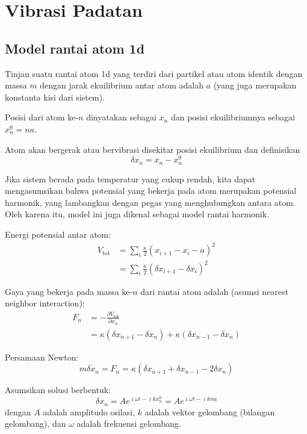 \chapter{Vibrasi Padatan}
\section{Model rantai atom 1d}

Tinjau suatu rantai atom 1d yang terdiri dari partikel atau atom identik
dengan massa \(m\) dengan jarak ekuilibrium antar atom adalah \(a\)
(yang juga merupakan konstanta kisi dari sistem).

Posisi dari atom ke-\(n\) dinyatakan sebagai \(x_{n}\) dan posisi
ekuilibriumnya sebagai \(x^{0}_{n} = na\).

Atom akan bergerak atau bervibrasi disekitar posisi ekuilibrium dan
definisikan \[
\delta x_{n} = x_{n} - x^{0}_{n}
\]

Jika sistem berada pada temperatur yang cukup rendah, kita dapat
mengasumsikan bahwa potensial yang bekerja pada atom merupakan potensial
harmonik, yang lambangkan dengan pegas yang menghubungkan antara atom.
Oleh karena itu, model ini juga dikenal sebagai model rantai harmonik.

Energi potensial antar atom:
\begin{align*}
V_{\mathrm{tot}} & = \sum_{i} \frac{\kappa}{2} \left(
x_{i+1} - x_{i} - a \right)^2 \\
& = \sum_{i} \frac{\kappa}{2} \left(
\delta x_{i+1} - \delta x_{i} \right)^2
\end{align*}

Gaya yang bekerja pada massa ke-\(n\) dari rantai atom adalah (asumsi
nearest neighbor interaction):
\begin{align*}
F_{n} & = -\frac{\partial V_{\mathrm{tot}}}{\partial x_{n}} \\
& = \kappa \left( \delta x_{n+1} - \delta x_{n} \right) +
\kappa \left( \delta x_{n-1} - \delta x_{n} \right)
\end{align*}

Persamaan Newton:
\begin{equation*}
m \ddot{\delta x_{n}} = F_{n} = \kappa \left(
    \delta x_{n+1} + \delta x_{n-1} - 2\delta x_{n}
    \right)    
\end{equation*}

Asumsikan solusi berbentuk:
\begin{equation*}
\delta x_{n} = A e^{\imath \omega t - \imath k x^{0}_{n}} = 
A e^{\imath \omega t - \imath k n a}
\end{equation*}
dengan $A$ adalah amplitudo osilasi, $k$ adalah vektor
gelombang (bilangan gelombang), dan $\omega$ adalah frekuensi
gelombang.

